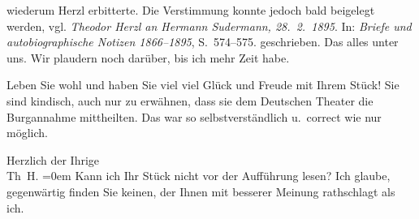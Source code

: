 {{{                  wiederum Herzl erbitterte. Die Verstimmung
                     konnte jedoch bald beigelegt werden, vgl. \emph{Theodor Herzl an Hermann Sudermann, 28. 2. 1895}. In: \emph{Briefe und
                           autobiographische Notizen 1866–1895}, S. 574–575.}}}\label{K_L03851-4} geschrieben. Das alles unter uns.
               Wir plaudern noch darüber, bis ich mehr Zeit habe.\pend
           
\pstart
           Leben Sie wohl und haben Sie viel viel Glück und Freude mit Ihrem Stück! Sie sind kindisch, auch nur zu
               erwähnen, dass sie dem Deutschen Theater die Burgannahme mittheilten. Das war so
               selbstverständlich u. correct wie nur möglich.\pend
           
\pstart
           Herzlich der Ihrige {\\[\baselineskip]}\spacefill\mbox{Th H.}\pend
           \leftskip=0em{}
\pstart
           \noindent{}Kann ich Ihr Stück nicht
                  vor der Aufführung lesen? Ich glaube, gegenwärtig finden Sie keinen, der Ihnen mit
                  besserer Meinung rathschlagt als ich.\pend
           \endnumbering{}
\begin{anhang}
\end{anhang}\newcommand{\dateiname}{L03851}\newcommand{\titel}{Theodor Herzl an Arthur Schnitzler, 20. 2. 1895}\newcommand{\editorInnen}{Selma Jahnke und Martin Anton Müller}
